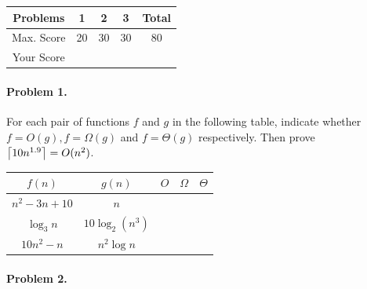 \documentclass[a4paper, 12pt]{article}
\begin{document}
	

	\begin{table}[h]
		\centering
		\begin{tabular}{|c|c|c|c|c|}
			\hline
			Problems &1&2&3& Total \\ \hline
			Max. Score & 20  & 30 & 30 & 80 \\ \hline
			Your Score & &  & & \\ \hline
		\end{tabular}
	\end{table}
	\bigskip
	
\paragraph{Problem 1.} 		For each pair of functions $f$ and $g$ in the following table, indicate whether $f = O(g), f = \Omega(g)$ and $f = \Theta(g)$ respectively.  Then prove $\left\lceil10 n^{1.9}\right\rceil = O(n^2)$.
		\begin{table}[h]
			\centering 
			\renewcommand{\arraystretch}{1.5}
			\begin{tabular}{|c|c||c|c|c|}
				\hline
				$f(n)$ & $g(n)$ & $O$ & $\Omega$ & $\Theta$\\ \hline
				$n^2 - 3n + 10$ &  $n $ & & & \\ \hline
				$\log_{3} n$ & $10\log_2 (n^3)$  & & & \\ \hline
				$10n^2-  n$ &  $n^2 \log n$ & & & \\ \hline
			\end{tabular}
		\end{table}
		
%		
	
\paragraph{Problem 2.}
\end{document}
